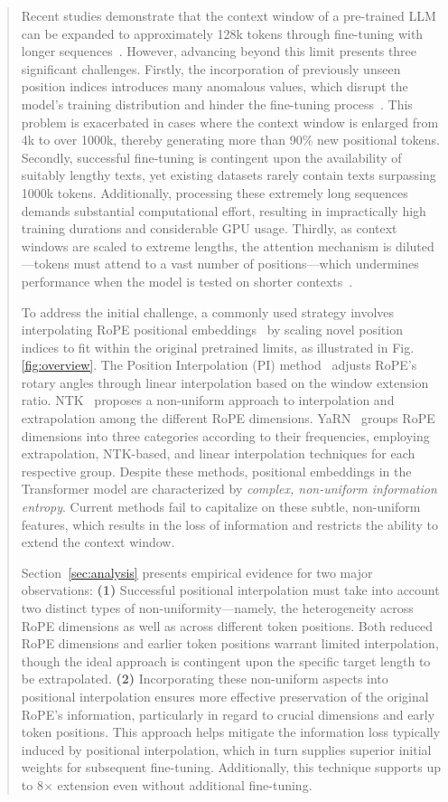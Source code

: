 \begin{abstract}
Recent studies demonstrate that the context window of a pre-trained LLM can be expanded to approximately 128k tokens through fine-tuning with longer sequences~\cite{longlora,pi,yarn,zhang2024soaring,liu2023scaling}. However, advancing beyond this limit presents three significant challenges. Firstly, the incorporation of previously unseen position indices introduces many anomalous values, which disrupt the model’s training distribution and hinder the fine-tuning process~\cite{pi}. This problem is exacerbated in cases where the context window is enlarged from 4k to over 1000k, thereby generating more than 90\% new positional tokens. Secondly, successful fine-tuning is contingent upon the availability of suitably lengthy texts, yet existing datasets rarely contain texts surpassing 1000k tokens. Additionally, processing these extremely long sequences demands substantial computational effort, resulting in impractically high training durations and considerable GPU usage. Thirdly, as context windows are scaled to extreme lengths, the attention mechanism is diluted—tokens must attend to a vast number of positions—which undermines performance when the model is tested on shorter contexts~\cite{pi}.

To address the initial challenge, a commonly used strategy involves interpolating RoPE positional embeddings~\cite{rope,pi} by scaling novel position indices to fit within the original pretrained limits, as illustrated in Fig.\ref{fig:overview}. The Position Interpolation (PI) method~\cite{pi} adjusts RoPE’s rotary angles through linear interpolation based on the window extension ratio. NTK~\cite{ntk,dynamicntk} proposes a non-uniform approach to interpolation and extrapolation among the different RoPE dimensions. YaRN~\cite{yarn} groups RoPE dimensions into three categories according to their frequencies, employing extrapolation, NTK-based, and linear interpolation techniques for each respective group. Despite these methods, positional embeddings in the Transformer model are characterized by \emph{complex, non-uniform information entropy}. Current methods fail to capitalize on these subtle, non-uniform features, which results in the loss of information and restricts the ability to extend the context window.

Section~\ref{sec:analysis} presents empirical evidence for two major observations: \textbf{(1)} Successful positional interpolation must take into account two distinct types of non-uniformity—namely, the heterogeneity across RoPE dimensions as well as across different token positions. Both reduced RoPE dimensions and earlier token positions warrant limited interpolation, though the ideal approach is contingent upon the specific target length to be extrapolated. \textbf{(2)} Incorporating these non-uniform aspects into positional interpolation ensures more effective preservation of the original RoPE's information, particularly in regard to crucial dimensions and early token positions. This approach helps mitigate the information loss typically induced by positional interpolation, which in turn supplies superior initial weights for subsequent fine-tuning. Additionally, this technique supports up to 8$\times$ extension even without additional fine-tuning.


\end{abstract}
